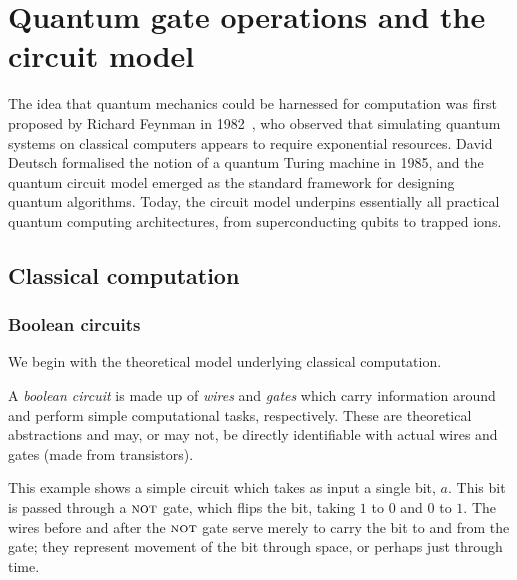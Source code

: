 
\section{Quantum gate operations and the circuit model}\label{sec:circuits}

\begin{historical}
The idea that quantum mechanics could be harnessed for computation was first
proposed by Richard Feynman in 1982~\cite{Feynman1982}, who observed that
simulating quantum systems on classical computers appears to require
exponential resources.  David Deutsch formalised the notion of a quantum
Turing machine in 1985, and the quantum circuit model emerged as the standard
framework for designing quantum algorithms. Today, the circuit model
underpins essentially all practical quantum computing architectures, from
superconducting qubits to trapped ions.
\end{historical}

\subsection{Classical computation}\label{subsec:classical}

\subsubsection{Boolean circuits}

We begin with the theoretical model underlying classical computation.

A \emph{boolean circuit} is made up of \emph{wires} and \emph{gates} which
carry information around and perform simple computational tasks,
respectively.  These are theoretical abstractions and may, or may not, be
directly identifiable with actual wires and gates (made from transistors).

\begin{center}
\end{center}
This example shows a simple circuit which takes as input a single bit, $a$.
This bit is passed through a $\textsc{not}$ gate, which flips the bit, taking $1$ to $0$
and $0$ to $1$. The wires before and after the $\textsc{not}$ gate serve merely to
carry the bit to and from the gate; they represent movement of the bit
through space, or perhaps just through time.

